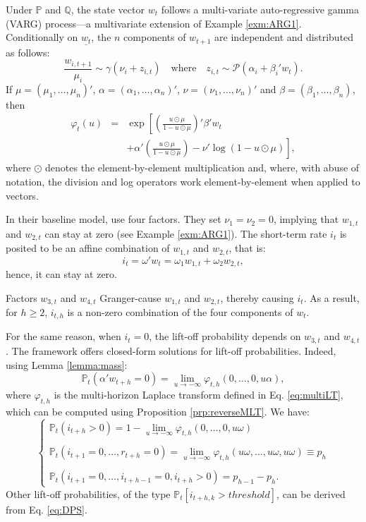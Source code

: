\documentclass[
  12pt,
]{book}
\theoremstyle{definition}
\theoremstyle{definition}
\theoremstyle{definition}
\theoremstyle{definition}
\theoremstyle{remark}
\begin{document}
Under \(\mathbb{P}\) and \(\mathbb{Q}\), the state vector \(w_t\) follows a multi-variate auto-regressive gamma (VARG) process---a multivariate extension of Example \ref{exm:ARG1}. Conditionally on \(\underline{w_t}\), the \(n\) components of \(w_{t+1}\) are independent and distributed as follows:
\begin{equation}
\frac{w_{i,t+1}}{\mu_i} \sim \gamma(\nu_i+z_{i,t}) \quad \mbox{where} \quad z_{i,t} \sim {\mathcal P} \left( \alpha_i + \beta_i' w_t \right).\label{eq:VARG}
\end{equation}
If \(\mu = (\mu_1,\dots,\mu_n)'\), \(\alpha = (\alpha_1,\dots,\alpha_n)'\), \(\nu = (\nu_1,\dots,\nu_n)'\) and \(\beta = (\beta_1,\dots,\beta_n)\), then
\begin{eqnarray*}
\varphi_t(u) &=& \exp\left[\left(\frac{u \odot \mu}{1 - u \odot \mu}\right)'\beta' w_t \right.\\
&& \left. + \alpha'\left(\frac{u \odot \mu}{1 - u \odot \mu}\right) - \nu'\log(1 - u \odot \mu)\right],
\end{eqnarray*}
where \(\odot\) denotes the element-by-element multiplication and, where, with abuse of notation, the division and log operators work element-by-element when applied to vectors.

In their baseline model, \citet{zarg_2017} use four factors. They set \(\nu_1 = \nu_2 = 0\), implying that \(w_{1,t}\) and \(w_{2,t}\) can stay at zero (see Example \ref{exm:ARG1}). The short-term rate \(i_t\) is posited to be an affine combination of \(w_{1,t}\) and \(w_{2,t}\), that is:
\[
i_t = \omega'w_t = \omega_{1} w_{1,t} + \omega_{2} w_{2,t},
\]
hence, it can stay at zero.

Factors \(w_{3,t}\) and \(w_{4,t}\) Granger-cause \(w_{1,t}\) and \(w_{2,t}\), thereby causing \(i_t\). As a result, for \(h \ge 2\), \(i_{t,h}\) is a non-zero combination of the four components of \(w_t\).

For the same reason, when \(i_t=0\), the lift-off probability depends on \(w_{3,t}\) and \(w_{4,t}\). The framework offers closed-form solutions for lift-off probabilities. Indeed, using Lemma \ref{lemma:mass}:
\[
\mathbb{P}_t(\alpha'w_{t+h}=0) = \lim_{u \rightarrow -\infty} \varphi_{t,h}(0,\dots,0,u\alpha),
\]
where \(\varphi_{t,h}\) is the multi-horizon Laplace transform defined in Eq. \eqref{eq:multiLT}, which can be computed using Proposition \ref{prp:reverseMLT}. We have:
\begin{equation}
\left\{
\begin{array}{l}
\mathbb{P}_t(i_{t+h}>0) = 1 - \lim_{u \rightarrow -\infty} \varphi_{t,h}(0,\dots,0,u\omega) \\ \\
\mathbb{P}_t(i_{t+1}=0,\dots,r_{t+h}=0) = \lim_{u \rightarrow -\infty} \varphi_{t,h}(u\omega,\dots,u\omega,u\omega) \equiv p_{h}\\ \\
\mathbb{P}_t(i_{t+1}=0,\dots,i_{t+h-1}=0,i_{t+h}>0) = p_{h-1} - p_h.
\end{array}
\right.
\end{equation}
Other lift-off probabilities, of the type \(\mathbb{P}_t[i_{t+h,k}>threshold]\), can be derived from Eq. \eqref{eq:DPS}.
\end{document}
